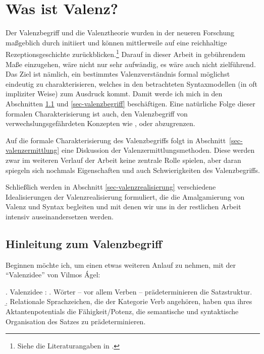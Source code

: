 \chapter{Was ist Valenz?} \label{ch-mit-valenz}

Der Valenzbegriff und die Valenztheorie wurden in der neueren Forschung ma\ss geblich durch \cite{Tesniere:59} initiiert und können mittlerweile auf eine reichhaltige Rezeptionsgeschichte zurückblicken.\footnote{Siehe die Literaturangaben in \citet[9]{Agel:00}.} Darauf in dieser Arbeit in gebührendem Ma\ss e einzugehen, wäre nicht nur sehr aufwändig, es wäre auch nicht zielführend. Das Ziel ist nämlich, ein bestimmtes Valenzverständnis formal möglichst eindeutig zu charakterisieren, welches in den betrachteten Syntaxmodellen (in oft impliziter Weise) zum Ausdruck kommt. Damit werde ich mich in den Abschnitten \ref{sec:valenz:hinführung} und \ref{sec-valenzbegriff} beschäftigen. Eine natürliche Folge dieser formalen Charakterisierung ist auch, den Valenzbegriff von verwechslungsgefährdeten Konzepten wie ,  oder  abzugrenzen.%

Auf die formale Charakterisierung des Valenzbegriffs folgt in Abschnitt~\ref{sec-valenzermittlung} eine Diskussion der Valenzermittlungsmethoden. Diese werden zwar im weiteren Verlauf der Arbeit keine zentrale Rolle spielen, aber daran spiegeln sich nochmals Eigenschaften und auch Schwierigkeiten des Valenzbegriffs.  

Schlie\ss lich werden in Abschnitt \ref{sec-valenzrealisierung} verschiedene Idealisierungen der Valenzrealisierung formuliert, die die Amalgamierung von Valenz und Syntax begleiten und mit denen wir uns in der restlichen Arbeit intensiv auseinandersetzen werden.

\section{Hinleitung zum Valenzbegriff} \label{sec:valenz:hinführung}

Beginnen möchte ich, um einen etwas weiteren Anlauf zu nehmen, mit der "`Valenzidee"' von Vilmos \'Agel:
 
\ex. Valenzidee \citep[105]{Agel:00}: 
\a. Wörter -- vor allem Verben -- prädeterminieren die Satzstruktur.\\ \citep[7]{Agel:00} 
\b. Relationale Sprachzeichen, die der Kategorie Verb angehören, haben qua ihres Aktantenpotentials die Fähigkeit/Potenz, die semantische und syntaktische Organisation des Satzes zu prädeterminieren.

